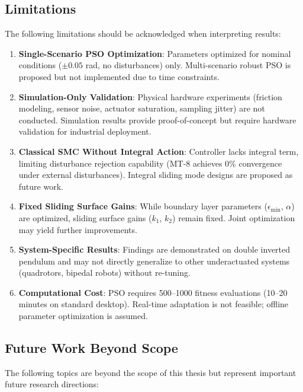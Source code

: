 \subsection{Limitations}

The following limitations should be acknowledged when interpreting results:

\begin{enumerate}
    \item \textbf{Single-Scenario PSO Optimization}: Parameters optimized for nominal conditions ($\pm0.05$ rad, no disturbances) only. Multi-scenario robust PSO is proposed but not implemented due to time constraints.

    \item \textbf{Simulation-Only Validation}: Physical hardware experiments (friction modeling, sensor noise, actuator saturation, sampling jitter) are not conducted. Simulation results provide proof-of-concept but require hardware validation for industrial deployment.

    \item \textbf{Classical SMC Without Integral Action}: Controller lacks integral term, limiting disturbance rejection capability (MT-8 achieves 0\% convergence under external disturbances). Integral sliding mode designs are proposed as future work.

    \item \textbf{Fixed Sliding Surface Gains}: While boundary layer parameters ($\epsilon_{\min}$, $\alpha$) are optimized, sliding surface gains ($k_1$, $k_2$) remain fixed. Joint optimization may yield further improvements.

    \item \textbf{System-Specific Results}: Findings are demonstrated on double inverted pendulum and may not directly generalize to other underactuated systems (quadrotors, bipedal robots) without re-tuning.

    \item \textbf{Computational Cost}: PSO requires 500--1000 fitness evaluations (10--20 minutes on standard desktop). Real-time adaptation is not feasible; offline parameter optimization is assumed.
\end{enumerate}

\subsection{Future Work Beyond Scope}

The following topics are beyond the scope of this thesis but represent important future research directions:

